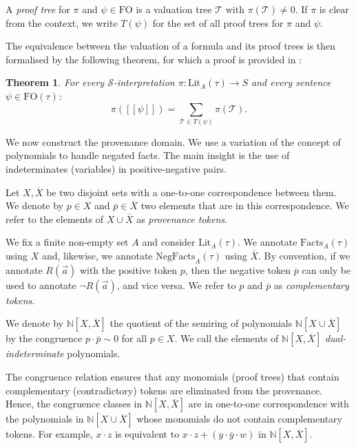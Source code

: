 \documentclass[oneside, 11pt]{amsbook}
\theoremstyle{plain}
\newtheorem{thm}{Theorem}[section]
\theoremstyle{definition}
\theoremstyle{remark}
\begin{document}
\begin{defn}
    A \emph{proof tree} for $\pi$ and $\psi \in \mathrm{FO}$ is a valuation tree $\mathcal{T}$ with $\pi(\mathcal{T}) \neq 0$. If $\pi$ is clear from the context, we write $T(\psi)$ for the set of all proof trees for $\pi$ and $\psi$.
\end{defn}

The equivalence between the valuation of a formula and its proof trees is then formalised by the following theorem, for which a proof is provided in \cite{Gradel2025}:

\begin{thm}
    For every $\mathcal{S}$-interpretation $\pi : \mathrm{Lit}_A(\tau) \to S$ and every sentence $\psi \in \mathrm{FO}(\tau)$:
    \[
        \pi([\![ \psi ]\!]) = \sum_{\mathcal{T} \in T(\psi)} \pi(\mathcal{T}).
    \]
\end{thm}

We now construct the provenance domain. We use a variation of the concept of polynomials to handle negated facts. The main insight is the use of indeterminates (variables) in positive-negative pairs.

Let $X, \overline{X}$ be two disjoint sets with a one-to-one correspondence between them. We denote by $p \in X$ and $\overline{p} \in \overline{X}$ two elements that are in this correspondence. We refer to the elements of $X \cup \overline{X}$ as \emph{provenance tokens}.

We fix a finite non-empty set $A$ and consider $\mathrm{Lit}_A(\tau)$. We annotate $\mathrm{Facts}_A(\tau)$ using $X$ and, likewise, we annotate $\mathrm{NegFacts}_A(\tau)$ using $\overline{X}$. By convention, if we annotate $R(\vec{a})$ with the positive token $p$, then the negative token $\overline{p}$ can only be used to annotate $\neg R(\vec{a})$, and vice versa. We refer to $p$ and $\overline{p}$ as \emph{complementary tokens}.

\begin{defn}
    We denote by $\mathbb{N}[X, \overline{X}]$ the quotient of the semiring of polynomials $\mathbb{N}[X \cup \overline{X}]$ by the congruence $p \cdot \overline{p} \sim 0$ for all $p \in X$. We call the elements of $\mathbb{N}[X, \overline{X}]$ \emph{dual-indeterminate} polynomials.
\end{defn}

The congruence relation ensures that any monomials (proof trees) that contain complementary (contradictory) tokens are eliminated from the provenance. Hence, the congruence classes in $\mathbb{N}[X, \overline{X}]$ are in one-to-one correspondence with the polynomials in $\mathbb{N}[X \cup \overline{X}]$ whose monomials do not contain complementary tokens. For example, $x \cdot z$ is equivalent to $x \cdot z + (y \cdot \overline{y} \cdot w)$ in $\mathbb{N}[X, \overline{X}]$.
\end{document}
